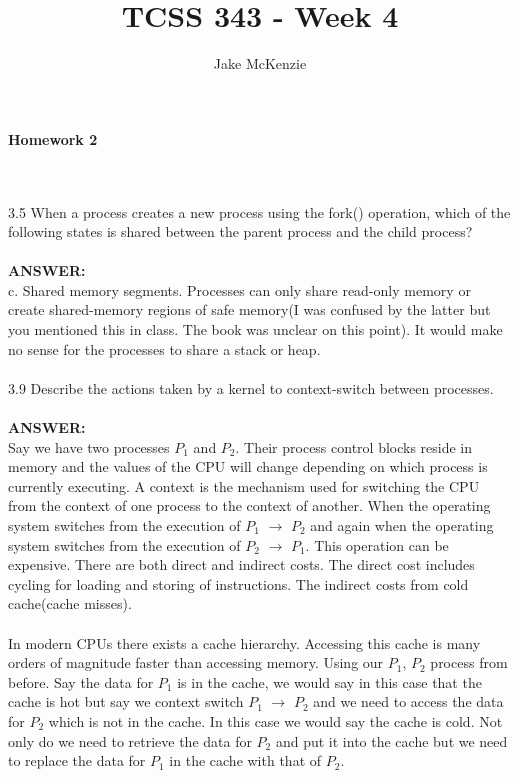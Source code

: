 \documentclass[12pt]{article}
\begin{document}
\title{TCSS 343 - Week 4}
\author{Jake McKenzie}
\maketitle
\noindent\centerline{\textbf{Homework 2}}
\\\\3.5 When a process creates a new process using the fork() operation, which
of the following states is shared between the parent process and the child
process?\\\\
\textbf{ANSWER: } \\c. Shared memory segments. Processes can only share read-only memory or
create shared-memory regions of safe memory(I was confused by the latter but you 
mentioned this in class. The book was unclear on this point). 
It would make no sense for the processes to 
share a stack or heap. \\\\
3.9 Describe the actions taken by a kernel to context-switch between
processes.\\\\
\textbf{ANSWER: } \\
Say we have two processes $P_1$ and $P_2$. Their process control blocks 
reside in memory and the values of the CPU will change depending on which process is 
currently executing. A context is the mechanism used for switching the CPU from 
the context of one process to the context of another. When the operating system 
switches from the execution of $P_1$ $\rightarrow$ $P_2$ and again
when the operating system switches from the execution of 
$P_2$ $\rightarrow$ $P_1$. This operation can be expensive. There are both 
direct and indirect costs. The direct cost includes cycling for loading and
storing of instructions. The indirect costs from cold cache(cache misses).\\\\

\noindent In modern CPUs there exists a cache hierarchy. Accessing this cache is many 
orders of magnitude faster than accessing memory. Using our $P_1$, $P_2$ process
from before. Say the data for $P_1$ is in the cache, we would say in this case 
that the cache is hot but say we context switch $P_1$ $\rightarrow$ $P_2$ and we 
need to access the data for $P_2$ which is not in the cache. In this case we would say 
the cache is cold. Not only do we need to retrieve the data for $P_2$ and put it into 
the cache but we need to replace the data for $P_1$ in the cache with that of $P_2$.\\\\
\end{document}
